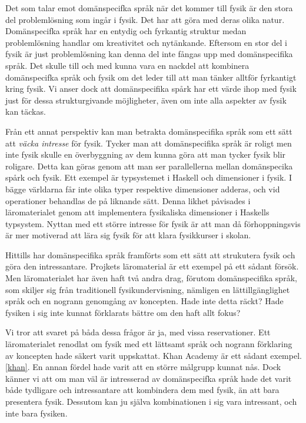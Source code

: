 \begin{binge}
Det som talar emot domänspecifka språk när det kommer till fysik är den stora del problemlösning som ingår i fysik. Det har att göra med deras olika natur. Domänspecifka språk har en entydig och fyrkantig struktur medan problemlösning handlar om kreativitet och nytänkande. Eftersom en stor del i fysik är just problemlösning kan denna del inte fångas upp med domänspecifika språk. Det skulle till och med kunna vara en nackdel att kombinera domänspecifka språk och fysik om det leder till att man tänker alltför fyrkantigt kring fysik. Vi anser dock att domänspecifika spårk har ett värde ihop med fysik just för dessa strukturgivande möjligheter, även om inte alla aspekter av fysik kan täckas.

Från ett annat perspektiv kan man betrakta domänspecifika språk som ett sätt att \textit{väcka intresse} för fysik. Tycker man att domänspecifika språk är roligt men inte fysik skulle en överbyggning av dem kunna göra att man tycker fysik blir roligare. Detta kan göras genom att man ser parallellerna mellan domänspecika spårk och fysik. Ett exempel är typsystemet i Haskell och dimensioner i fysik. I bägge världarna får inte olika typer respektive dimensioner adderas, och vid operationer behandlas de på liknande sätt. Denna likhet påvisades i läromaterialet genom att implementera fysikaliska dimensioner i Haskells typsystem. Nyttan med ett större intresse för fysik är att man då förhoppningsvis är mer motiverad att lära sig fysik för att klara fysikkurser i skolan.

Hittills har domänspecifika språk framförts som ett sätt att strukutera fysik och göra den intressantare. Projkets läromaterial är ett exempel på ett sådant försök. Men läromaterialet har även haft två andra drag, förutom domänspecifika språk, som skiljer sig från traditionell fysikundervisning, nämligen en lättillgänglighet språk och en nogrann genomgång av koncepten. Hade inte detta räckt? Hade fysiken i sig inte kunnat förklarats bättre om den haft allt fokus?

Vi tror att svaret på båda dessa frågor är ja, med vissa reservationer. Ett läromaterialet renodlat om fysik med ett lättsamt språk och nogrann förklaring av koncepten hade säkert varit uppskattat. Khan Academy är ett sådant exempel.\ref{khan}. En annan fördel hade varit att en större målgrupp kunnat nås. Dock känner vi att om man väl är intresserad av domänspecifka språk hade det varit både tydligare och intressantare att kombindera dem med fysik, än att bara presentera fysik. Dessutom kan ju själva kombinationen i sig vara intressant, och inte bara fysiken.


\end{binge}
